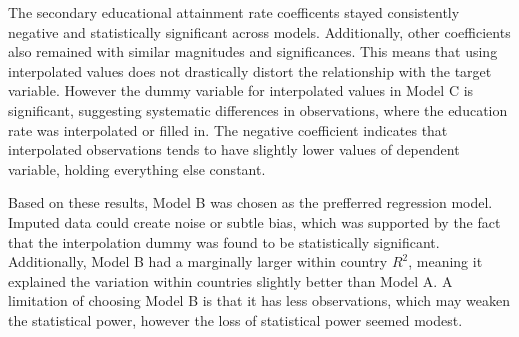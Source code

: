 \renewcommand{\arraystretch}{1.3}

\begin{table}[ht]
\small
\caption{Sensitivity analysis models}
\centering
{}
\label{tab:sensitivity}
\end{table}

The secondary educational attainment rate coefficents stayed consistently negative and statistically
significant across models. Additionally, other coefficients also remained with similar magnitudes 
and significances. This means that using interpolated values does not drastically distort the 
relationship with the target variable. However the dummy variable for interpolated values in Model C 
is significant, suggesting systematic differences in observations, where the education 
rate was interpolated or filled in. The negative coefficient indicates that interpolated observations 
tends to have slightly lower values of dependent variable, holding everything else constant.

Based on these results, Model B was chosen as the prefferred regression model. Imputed data could 
create noise or subtle bias, which was supported by the fact that the interpolation dummy was 
found to be statistically significant. Additionally, Model B had a marginally larger within country 
$R^2$, meaning it explained the variation within countries slightly better than Model A. A limitation 
of choosing Model B is that it has less observations, which may weaken the statistical power, 
however the loss of statistical power seemed modest.

